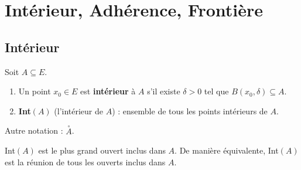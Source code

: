 \documentclass[oneside]{book}
\begin{document}
\section{Intérieur, Adhérence, Frontière}

\subsection{Intérieur}

\begin{definition}
Soit $A \subseteq E$.
\begin{enumerate}
    \item Un point $x_0 \in E$ est \textbf{intérieur} à $A$ s'il existe $\delta > 0$ tel que $B(x_0, \delta) \subseteq A$.
    \item \textbf{Int$(A)$} (l'intérieur de $A$) : ensemble de tous les points intérieurs de $A$.
\end{enumerate}
Autre notation : $\overset{\circ}{A}$.
\end{definition}

\begin{proposition}
Int$(A)$ est le plus grand ouvert inclus dans $A$. De manière équivalente, Int$(A)$ est la réunion de tous les ouverts inclus dans $A$.
\end{proposition}
\end{document}

